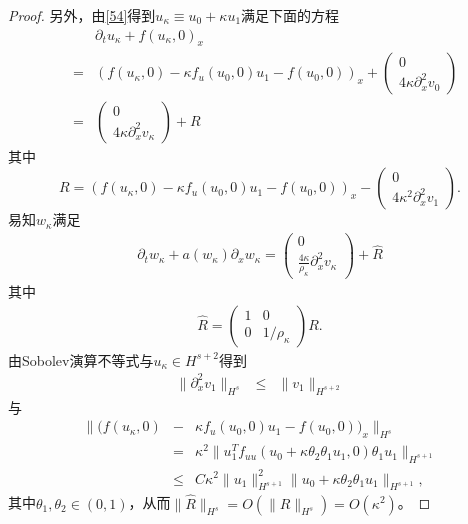 \begin{proof}
另外，由\eqref{54}得到$u_\kappa \equiv u_0 +\kappa u_1$满足下面的方程
\begin{eqnarray*}
  &&\partial_t u_\kappa + f(u_\kappa,0)_x \nonumber \\
  &=&  (f(u_\kappa,0) - \kappa f_u(u_0,0)u_1 - f(u_0,0))_x + \left( \begin{array}{c} 0 \\ 4 \kappa \partial^2_x v_0 \end{array} \right) \nonumber \\
	&=& \left( \begin{array}{c} 0 \\ 4 \kappa \partial^2_x v_\kappa \end{array} \right)   + R
\end{eqnarray*}
其中
$$
R=(f(u_\kappa,0) - \kappa f_u(u_0,0)u_1 - f(u_0,0))_x -\left( \begin{array}{c} 0 \\ 4 \kappa^2 \partial^2_x v_1 \end{array} \right).
$$
易知$w_\kappa$满足
\begin{eqnarray}\label{58}
  \partial_t w_\kappa + a(w_\kappa) \partial_x w_\kappa = \left( \begin{array}{cc} 0 \\ \frac{4 \kappa}{\rho_\kappa} \partial^2_x v_\kappa \end{array} \right) + \hat R
\end{eqnarray}
其中
\begin{eqnarray*}
\hat{R} = \left( \begin{array}{cc} 1 & 0 \\ 0 & 1/\rho_\kappa \end{array} \right)R .
\end{eqnarray*}
由Sobolev演算不等式\cite{majda1984compressible}与$u_\kappa \in H^{s+2}$得到
\begin{eqnarray*}
  \|\partial^2_x v_1 \|_{H^s} &\le&  \|v_1\|_{H^{s+2}}
\end{eqnarray*}
与
\begin{eqnarray*}
  \|(f(u_\kappa,0) &-& \kappa f_u(u_0,0)u_1 - f(u_0,0))_x\|_{H^s} \\
  &=& \kappa^2 \| u_1^Tf_{uu}(u_0+\kappa \theta_2 \theta_1  u_1,0) \theta_1 u_1\|_{H^{s+1}} \\
  &\le&  C \kappa^2 \|u_1\|_{H^{s+1}}^2 \|u_0+\kappa \theta_2 \theta_1  u_1\|_{H^{s+1}},
\end{eqnarray*}
其中$\theta_1,\theta_2 \in (0,1)$，从而$\|\hat{R}\|_{H^s} =O(\|R\|_{H^s})= O(\kappa^2)$。



\end{proof}
